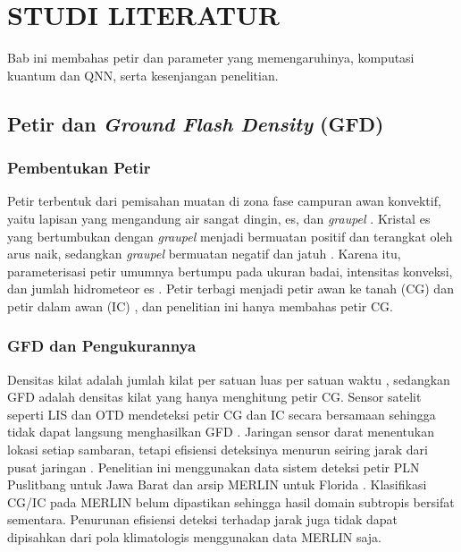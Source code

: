 \chapter{STUDI LITERATUR}
\label{chap:studi-literatur}
Bab ini membahas petir dan parameter yang memengaruhinya, komputasi kuantum dan QNN, serta kesenjangan penelitian.

\section{Petir dan \textit{Ground Flash Density} (GFD)}

\subsection{Pembentukan Petir}
Petir terbentuk dari pemisahan muatan di zona fase campuran awan konvektif, yaitu lapisan yang mengandung air sangat dingin, es, dan \textit{graupel} \cite{shanTBDMLI}.
Kristal es yang bertumbukan dengan \textit{graupel} menjadi bermuatan positif dan terangkat oleh arus naik, sedangkan \textit{graupel} bermuatan negatif dan jatuh \cite{cheng2024MLLP}.
Karena itu, parameterisasi petir umumnya bertumpu pada ukuran badai, intensitas konveksi, dan jumlah hidrometeor es \cite{cheng2024MLLP}.
Petir terbagi menjadi petir awan ke tanah (CG) dan petir dalam awan (IC) \cite{shanTBDMLI}, dan penelitian ini hanya membahas petir CG.

\subsection{GFD dan Pengukurannya}
Densitas kilat adalah jumlah kilat per satuan luas per satuan waktu \cite{peterson2021LISOTD}, sedangkan GFD adalah densitas kilat yang hanya menghitung petir CG.
Sensor satelit seperti LIS dan OTD mendeteksi petir CG dan IC secara bersamaan sehingga tidak dapat langsung menghasilkan GFD \cite{peterson2021LISOTD}.
Jaringan sensor darat menentukan lokasi setiap sambaran, tetapi efisiensi deteksinya menurun seiring jarak dari pusat jaringan \cite{song2023LNAI}.
Penelitian ini menggunakan data sistem deteksi petir PLN Puslitbang untuk Jawa Barat dan arsip MERLIN untuk Florida \cite{ksc2026merlin}.
Klasifikasi CG/IC pada MERLIN belum dipastikan sehingga hasil domain subtropis bersifat sementara.
Penurunan efisiensi deteksi terhadap jarak juga tidak dapat dipisahkan dari pola klimatologis menggunakan data MERLIN saja.

